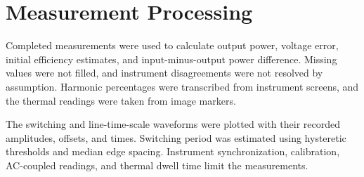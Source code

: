 \section{Measurement Processing}
\label{sec:app-analysis-tools}

Completed measurements were used to calculate output power, voltage error,
initial efficiency estimates, and input-minus-output power difference. Missing
values were not filled, and instrument disagreements were not resolved by
assumption. Harmonic percentages were transcribed from instrument screens, and
the thermal readings were taken from image markers.

The switching and line-time-scale waveforms were plotted with their recorded
amplitudes, offsets, and times. Switching period was estimated using hysteretic
thresholds and median edge spacing. Instrument synchronization, calibration,
AC-coupled readings, and thermal dwell time limit the measurements.
